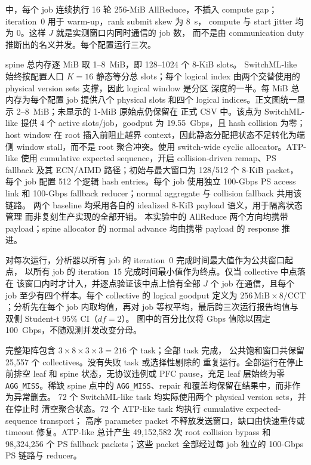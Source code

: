  中，每个 job 连续执行 16 轮 256-MiB
AllReduce，不插入 compute gap；iteration~0 用于 warm-up，rank submit
skew 为 8~\textmu s，
compute 与 start jitter 均为 0。这样 $J$ 就是实测窗口内同时通信的 job 数，
而不是由 communication duty 推断出的名义并发。每个配置运行三次。

spine 总内存逐 MiB 取 1--8~MiB，即 128--1024 个 8-KiB slots。
SwitchML-like 始终按配置人口 $K=16$ 静态等分总 slots；每个 logical index
由两个交替使用的 physical version sets 支撑，因此 logical window 是分区
深度的一半。每 MiB 总内存为每个配置 job 提供八个 physical slots 和四个
logical indices。正文图统一显示 2--8~MiB；未显示的 1-MiB 原始点仍保留在
正式 CSV 中。该点为 SwitchML-like 提供 4 个 active slots/job，goodput 为
19.55~Gbps，且 hash collision 为零；host window 在 root 插入前阻止越界
context，因此静态分配把状态不足转化为端侧 window stall，而不是 root
聚合冲突。\sysname 使用 switch-wide cyclic
allocator。ATP-like 使用
cumulative expected sequence，开启 collision-driven remap、PS fallback
及其 ECN/AIMD 路径；初始与最大窗口为 128/512 个 8-KiB packet，每个 job
配置 512 个逻辑 hash entries。每个 job 使用独立 100-Gbps PS access link 和
100-Gbps fallback reducer；normal aggregate 与 collision fallback 共用该链路。
两个 baseline 均采用各自的 idealized 8-KiB payload 语义，用于隔离状态管理
而非复刻生产实现的全部开销。
本实验中的 AllReduce 两个方向均携带 payload；spine allocator 的 normal
advance 均由携带 payload 的 response 推进。

对每次运行，分析器以所有 job 的 iteration~0 完成时间最大值作为公共窗口起点，
以所有 job 的 iteration~15 完成时间最小值作为终点。仅当 collective 中点落在
该窗口内时才计入，并逐点验证该中点上恰有全部 $J$ 个 job 在通信，且每个 job
至少有四个样本。每个 collective 的 logical goodput 定义为
$256\,\mathrm{MiB}\times8/\mathrm{CCT}$；分析先在每个 job 内取均值，再对
job 等权平均，最后跨三次运行报告均值与双侧 Student-t 95\% CI（$df=2$）。
图中的百分比仅将 Gbps 值除以固定 100~Gbps，不随观测并发改变分母。

完整矩阵包含 $3\times8\times3\times3=216$ 个 task；全部 task 完成，
公共饱和窗口共保留 25,557 个 collectives。没有失败 task 或选择性剔除的
重复运行。全部运行在停止前排空 leaf 和 spine 状态，无协议违例或 PFC
pause，充足 leaf 层始终为零 \texttt{AGG\_MISS}。稀缺 spine 点中的
\texttt{AGG\_MISS}、repair 和覆盖均保留在结果中，而非作为异常删去。
72 个 SwitchML-like task 均实际使用两个 physical version sets，并在停止时
清空聚合状态。72 个 ATP-like task 均执行 cumulative expected-sequence transport；
高序 parameter packet 不释放发送窗口，缺口由快速重传或 timeout 修复。ATP-like
总计产生 49,152,582 次 root collision bypass 和 98,324,256 个 PS fallback
packets；这些 packet 全部经过每 job 独立的 100-Gbps PS 链路与 reducer。


